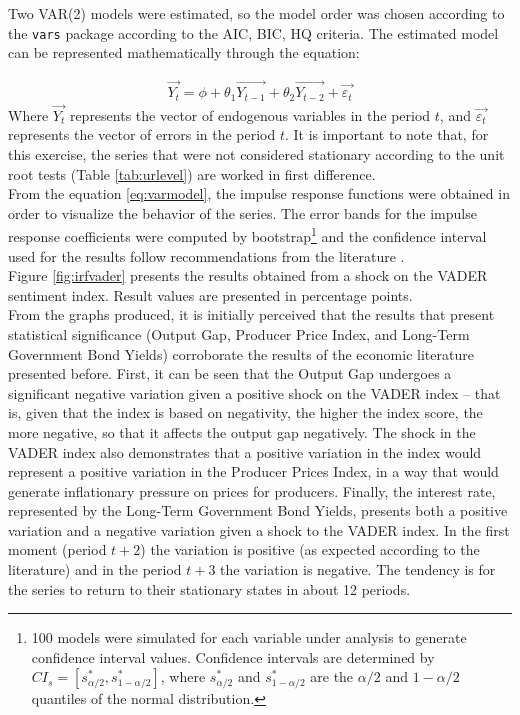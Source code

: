 Two VAR(2) models were estimated, so the model order was chosen according to the \texttt{vars} \cite{pfaff2008var, pfaff2008book} package according to the AIC, BIC, HQ criteria. The estimated model can be represented mathematically through the equation:

\begin{align} \label{eq:varmodel}
    \overrightarrow{Y_t} = \phi + \theta_1 \overrightarrow{Y_{t-1}} + \theta_2 \overrightarrow{Y_{t-2}} + \overrightarrow{\varepsilon_t} 
\end{align}
Where $\overrightarrow{Y_{t}}$ represents the vector of endogenous variables in the period $t$, and $\overrightarrow{\varepsilon_t}$ represents the vector of errors in the period $t$. It is important to note that, for this exercise, the series that were not considered stationary according to the unit root tests (Table \ref{tab:urlevel}) are worked in first difference.\\

From the equation \ref{eq:varmodel}, the impulse response functions were obtained in order to visualize the behavior of the series. The error bands for the impulse response coefficients were computed by bootstrap\footnote{100 models were simulated for each variable under analysis to generate confidence interval values. Confidence intervals are determined by $CI_s = [s^* _{\alpha / 2}, s^* _{1 - \alpha / 2}]$, where $s^* _{\alpha / 2}$ and $s^* _{1 - \alpha / 2}$ are the $\alpha/2$ and $1 - \alpha/2$ quantiles of the normal distribution\cite[p. 17]{pfaff2008var}.} and the confidence interval used for the results follow recommendations from the literature \cite[p. 40]{shapiro2020measuring}.\\

Figure \ref{fig:irfvader} presents the results obtained from a shock on the VADER sentiment index. Result values are presented in percentage points.\\

From the graphs produced, it is initially perceived that the results that present statistical significance (Output Gap, Producer Price Index, and Long-Term Government Bond Yields) corroborate the results of the economic literature presented before. First, it can be seen that the Output Gap undergoes a significant negative variation given a positive shock on the VADER index -- that is, given that the index is based on negativity, the higher the index score, the more negative, so that it affects the output gap negatively. The shock in the VADER index also demonstrates that a positive variation in the index would represent a positive variation in the Producer Prices Index, in a way that would generate inflationary pressure on prices for producers. Finally, the interest rate, represented by the Long-Term Government Bond Yields, presents both a positive variation and a negative variation given a shock to the VADER index. In the first moment (period $t + 2$) the variation is positive (as expected according to the literature) and in the period $t + 3$ the variation is negative. The tendency is for the series to return to their stationary states in about 12 periods.\\


